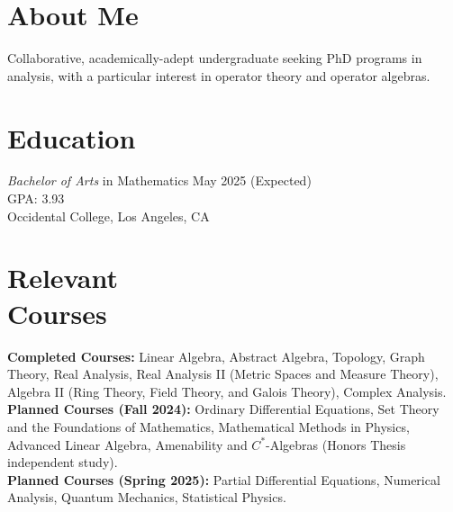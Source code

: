 \documentclass[margin, 12pt]{res} %
\begin{document}
\begin{resume}

\section{\sc About Me}
Collaborative, academically-adept undergraduate seeking PhD programs in analysis, with a particular interest in operator theory and operator algebras.

\section{\sc Education}

{\sl Bachelor of Arts} in Mathematics \hfill May 2025 (Expected) \\
GPA: 3.93\\
Occidental College, Los Angeles, CA 
\section{\sc Relevant \\ Courses}

\textbf{Completed Courses:} Linear Algebra, Abstract Algebra, Topology, Graph Theory, Real Analysis, Real Analysis II (Metric Spaces and Measure Theory), Algebra II (Ring Theory, Field Theory, and Galois Theory), Complex Analysis.\\

\textbf{Planned Courses (Fall 2024):} Ordinary Differential Equations, Set Theory and the Foundations of Mathematics, Mathematical Methods in Physics, Advanced Linear Algebra, Amenability and $C^{\ast}$-Algebras (Honors Thesis independent study).\\

\textbf{Planned Courses (Spring 2025):} Partial Differential Equations, Numerical Analysis, Quantum Mechanics, Statistical Physics.

\end{resume}
\end{document}
